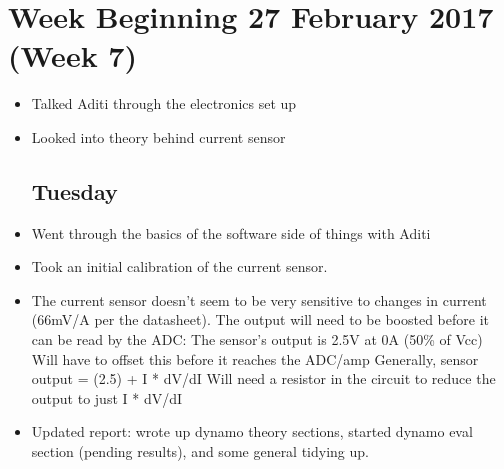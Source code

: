 \documentclass[a4]{report}
\def\mon{\subsection*{Monday}}
\def\tue{\subsection*{Tuesday}}
\begin{document}
	\section{Week Beginning 27 February 2017 (Week 7)}
	\begin{itemize}
		\mon
		\item Talked Aditi through the electronics set up
		\item Looked into theory behind current sensor
		\tue
		\item Went through the basics of the software side of things with Aditi
		\item Took an initial calibration of the current sensor.
		\item The current sensor doesn't seem to be very sensitive to changes in current (66mV/A per the datasheet). The output will need to be boosted before it can be read by the ADC:
		\subitem The sensor's output is 2.5V at 0A (50\% of Vcc)
		\subitem Will have to offset this before it reaches the ADC/amp
		\subitem Generally, sensor output = (2.5) + I * dV/dI
		\subitem Will need a resistor in the circuit to reduce the output to just I * dV/dI
		\item Updated report: wrote up dynamo theory sections, started dynamo eval section (pending results), and some general tidying up.

\end{itemize}
\end{document}
